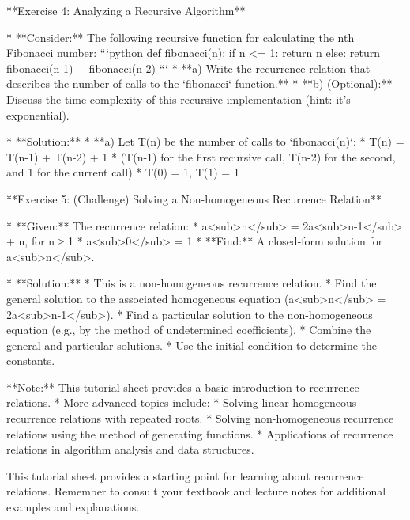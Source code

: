 **Exercise 4: Analyzing a Recursive Algorithm**

*   **Consider:** The following recursive function for calculating the nth Fibonacci number:
      ```python
      def fibonacci(n):
          if n <= 1:
              return n
          else:
              return fibonacci(n-1) + fibonacci(n-2)
      ```
*   **a) Write the recurrence relation that describes the number of calls to the `fibonacci` function.**
*   **b) (Optional):** Discuss the time complexity of this recursive implementation (hint: it's exponential).

*   **Solution:**
    *   **a) Let T(n) be the number of calls to `fibonacci(n)`:
        *   T(n) = T(n-1) + T(n-2) + 1 
          *   (T(n-1) for the first recursive call, T(n-2) for the second, and 1 for the current call)
        *   T(0) = 1, T(1) = 1 

**Exercise 5: (Challenge) Solving a Non-homogeneous Recurrence Relation**

*   **Given:** The recurrence relation:
      *   a<sub>n</sub> = 2a<sub>n-1</sub> + n, for n ≥ 1
      *   a<sub>0</sub> = 1
*   **Find:** A closed-form solution for a<sub>n</sub>. 

*   **Solution:**
    *   This is a non-homogeneous recurrence relation. 
    *   Find the general solution to the associated homogeneous equation (a<sub>n</sub> = 2a<sub>n-1</sub>).
    *   Find a particular solution to the non-homogeneous equation (e.g., by the method of undetermined coefficients).
    *   Combine the general and particular solutions.
    *   Use the initial condition to determine the constants. 

**Note:** This tutorial sheet provides a basic introduction to recurrence relations. 
*   More advanced topics include: 
    *   Solving linear homogeneous recurrence relations with repeated roots.
    *   Solving non-homogeneous recurrence relations using the method of generating functions. 
    *   Applications of recurrence relations in algorithm analysis and data structures.

This tutorial sheet provides a starting point for learning about recurrence relations. Remember to consult your textbook and lecture notes for additional examples and explanations.
